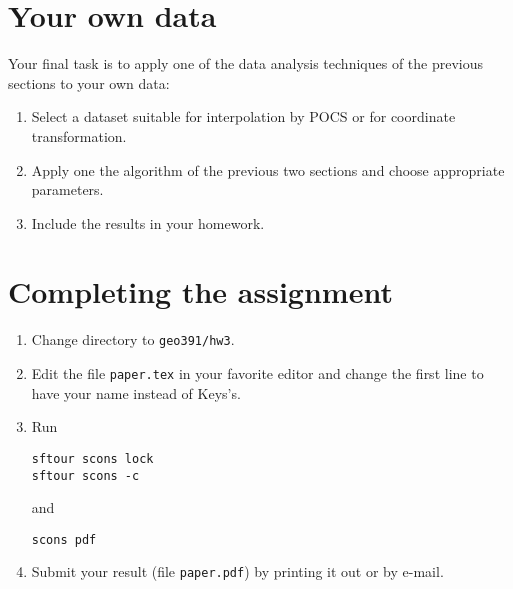 

\section{Your own data}

Your final task is to apply one of the data analysis techniques of the
previous sections to your own data:
\begin{enumerate}
\item Select a dataset suitable for interpolation by POCS or for
  coordinate transformation.
\item Apply one the algorithm of the previous two sections and choose
  appropriate parameters.
\item Include the results in your homework.
\end{enumerate}

\section{Completing the assignment}

\begin{enumerate}
\item Change directory to \verb#geo391/hw3#.
\item Edit the file \texttt{paper.tex} in your favorite editor and change the
  first line to have your name instead of Keys's.
\item Run
\begin{verbatim}
sftour scons lock
sftour scons -c
\end{verbatim}
and
\begin{verbatim}
scons pdf
\end{verbatim}
\item Submit your result (file \texttt{paper.pdf}) by printing it out
  or by e-mail.
\end{enumerate}

\nocite{keys}



